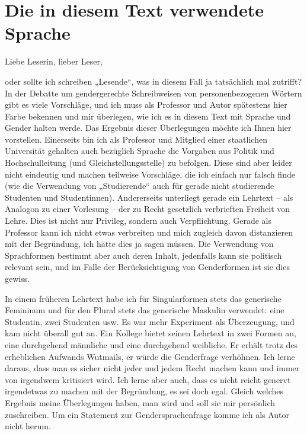 \cleardoublepage
\chapter*{Die in diesem Text verwendete Sprache}
\label{sec:Kap-0.2}

\vspace{1cm} %

Liebe Leserin, lieber Leser,

oder sollte ich schreiben „Lesende“, was in diesem Fall ja tatsächlich mal zutrifft? In der Debatte um gendergerechte Schreibweisen von personenbezogenen Wörtern gibt es viele Vorschläge, und ich muss als Professor und Autor spätestens hier Farbe bekennen und mir überlegen, wie ich es in diesem Text mit Sprache und Gender halten werde. Das Ergebnis dieser Überlegungen möchte ich Ihnen hier vorstellen. Einerseits bin ich als Professor und Mitglied einer staatlichen Universität gehalten auch bezüglich Sprache die Vorgaben aus Politik und Hochschulleitung (und Gleich\-stellungsstelle) zu befolgen. Diese sind aber leider nicht eindeutig und machen teilweise Vorschläge, die ich einfach nur falsch finde (wie die Verwendung von „Studierende“ auch für gerade nicht studierende Studenten und Studentinnen). \mbox{Andererseits} unterliegt gerade ein Lehrtext – als Analogon zu einer Vorlesung – der zu Recht gesetzlich verbrieften Freiheit von Lehre. Dies ist nicht nur Privileg, sondern auch Verpflichtung. Gerade als Professor kann ich nicht etwas verbreiten und mich zugleich davon distanzieren mit der Begründung, ich hätte dies ja sagen müssen. Die Verwendung von Sprachformen bestimmt aber auch deren Inhalt, jedenfalls kann sie politisch relevant sein, und im Falle der Berücksichtigung von Genderformen ist sie dies gewiss.

In einem früheren Lehrtext habe ich für Singularformen stets das generische Femininum und für den Plural stets das generische Maskulin verwendet: eine Studentin, zwei Studenten usw. Es war mehr Experiment als Überzeugung, und kam nicht überall gut an. Ein Kollege bietet seinen Lehrtext in zwei Formen an, eine durchgehend männliche und eine durchgehend weibliche. Er erhält trotz des erheblichen Aufwands Wutmails, er würde die Genderfrage verhöhnen. Ich lerne daraus, dass man es sicher nicht jeder und jedem Recht machen kann und immer von irgendwem kritisiert wird. Ich lerne aber auch, dass es nicht reicht genervt irgendetwas zu machen mit der Begründung, es sei doch egal. Gleich welches Ergebnis meine Über\-legungen haben, man wird und soll sie mir persönlich zuschreiben. Um ein Statement zur Gendersprachenfrage komme ich als Autor nicht herum.

